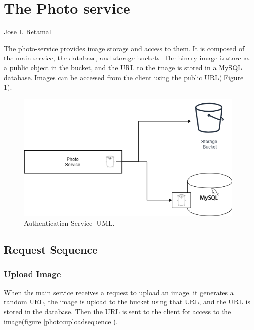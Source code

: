 \section{The Photo service}{Jose I. Retamal }

\indent
\indent
The photo-service provides image storage and access to them. It is composed of the main service, the database, and storage buckets.
The binary image is store as a public object in the bucket, and the URL to the image is stored in a MySQL database. Images can be accessed from the client using the public URL(
Figure \ref{photo:mainuml}). 

\begin{figure}[H]
	\begin{center}
		\includegraphics[width=120mm,scale=1]{img/photos/photos-main-uml.png}
		\caption{Authentication Service- UML.}
		\label{photo:mainuml}
	\end{center}
	
\end{figure}

\subsection{Request Sequence}

\subsubsection{Upload Image}

When the main service receives a request to upload an image, it generates a random URL, the image is upload to the bucket using that URL, and the URL is stored in the database. Then the URL is sent to the client for access to the image(figure \ref{photo:uploadsequence}).

